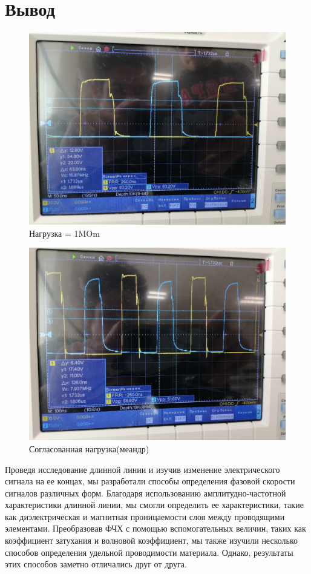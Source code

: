 \documentclass[a4paper,12pt]{article}
\theoremstyle{definition}
\begin{document}
	\section{Вывод}
 \begin{figure}[h!]
 		\centering
 		\includegraphics[scale=0.2]{7.jpg}
 		\caption{Нагрузка \Omega = 1MOm}
 	\end{figure}
  \begin{figure}[h!]
 		\centering
 		\includegraphics[scale=0.2]{8.jpg}
 		\caption{Согласованная нагрузка(меандр)}
 	\end{figure}
Проведя исследование длинной линии и изучив изменение электрического сигнала на ее концах, мы разработали способы определения фазовой скорости сигналов различных форм. Благодаря использованию амплитудно-частотной характеристики длинной линии, мы смогли определить ее характеристики, такие как диэлектрическая и магнитная проницаемости слоя между проводящими элементами. Преобразовав ФЧХ с помощью вспомогательных величин, таких как коэффициент затухания и волновой коэффициент, мы также изучили несколько способов определения удельной проводимости материала. Однако, результаты этих способов заметно отличались друг от друга.
\end{document}
